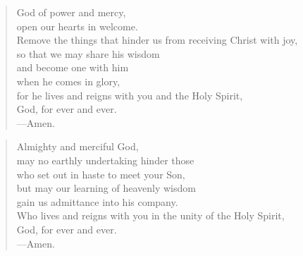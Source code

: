 \prayer

\setlength{\vleftmargin}{\prayerleftmargini}

\begin{verse}
God of power and mercy,\\
open our hearts in welcome.\\
Remove the things that hinder us from receiving Christ with joy,\\
so that we may share his wisdom\\
and become one with him\\
when he comes in glory,\\
for he lives and reigns with you and the Holy Spirit,\\
God, for ever and ever.\\
{\color{red}---\thinspace}Amen.
\end{verse}


\begin{verse}
Almighty and merciful God,\\
may no earthly undertaking hinder those\\
who set out in haste to meet your Son,\\
 but may our learning of heavenly wisdom\\
gain us admittance into his company.\\
Who lives and reigns with you in the unity of the Holy Spirit,\\
God, for ever and ever.\\
{\color{red}---\thinspace}Amen.
\end{verse}

\setlength{\vleftmargin}{\defleftmargini}